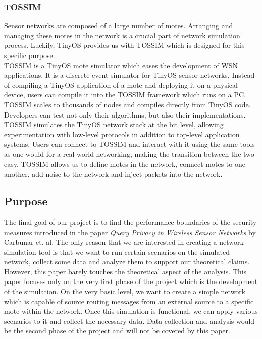 \documentclass[11pt, titlepage, oneside]{article}
\begin{document}
\subsubsection{TOSSIM} 
Sensor networks are composed of a large number of motes. Arranging and managing these motes in the network is a crucial part of network simulation process. Luckily, TinyOS provides us with TOSSIM which is designed for this specific purpose.\\
TOSSIM is a TinyOS mote simulator which eases the development of WSN applications. It is a discrete event simulator for TinyOS sensor networks. Instead of compiling a TinyOS application of a mote and deploying it on a physical device, users can compile it into the TOSSIM framework which runs on a PC. TOSSIM scales to thousands of nodes and compiles directly from TinyOS code. Developers can test not only their algorithms, but also their implementations. TOSSIM simulates the TinyOS network stack at the bit level, allowing experimentation with low-level protocols in addition to top-level application systems. Users can connect to TOSSIM and interact with it using the same tools as one would for a real-world networking, making the transition between the two easy\cite{tossim}. TOSSIM allows us to define motes in the network, connect motes to one another, add noise to the network and inject packets into the network.
 
\subsection{Purpose} 

The final goal of our project is to find the performance boundaries of the security measures introduced in the paper {\it Query Privacy in Wireless Sensor Networks} by Carbunar et. al. The only reason that we are interested in creating a network simulation tool is that we want to run certain scenarios on the simulated network, collect some data and analyze them to support our theoretical claims. However, this paper barely touches the theoretical aspect of the analysis. This paper focuses only on the very first phase of the project which is the development of the simulation. On the very basic level, we want to create a simple network which is capable of source routing messages from an external source to a specific mote within the network. Once this simulation is functional, we can apply various scenarios to it and collect the necessary data. Data collection and analysis would be the second phase of the project and will not be covered by this paper.
\end{document}
